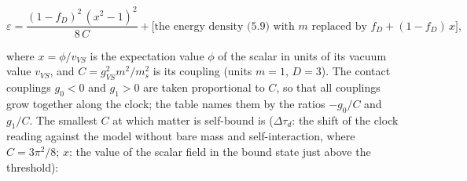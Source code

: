 \documentclass[
  10pt,
]{article}
\begin{document}
\[\varepsilon=\frac{(1-f_D)^2\,(x^2-1)^2}{8\,C}+\Big[\text{the energy density (5.9) with }m\text{ replaced by }f_D+(1-f_D)\,x\Big],\tag{9.1}\]

where \(x=\phi/v_{VS}\) is the expectation value \(\phi\) of the scalar
in units of its vacuum value \(v_{VS}\), and \(C=g_{VS}^2m^2/m_s^2\) is
its coupling (units \(m=1\), \(D=3\)). The contact couplings \(g_0<0\)
and \(g_1>0\) are taken proportional to \(C\), so that all couplings
grow together along the clock; the table names them by the ratios
\(-g_0/C\) and \(g_1/C\). The smallest \(C\) at which matter is
self-bound is (\(\Delta\tau_d\): the shift of the clock reading against
the model without bare mass and self-interaction, where \(C=3\pi^2/8\);
\(x\): the value of the scalar field in the bound state just above the
threshold):
\end{document}
